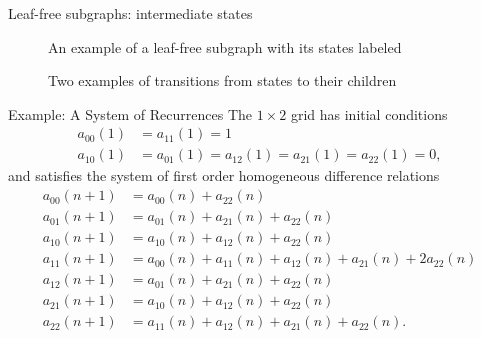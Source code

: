 \documentclass{beamer}%
\newcommand\indxx[2]{#1#2}
\begin{document}
\begin{frame}{Leaf-free subgraphs: intermediate states}
  \begin{figure}[ht!]
    
    \caption{An example of a leaf-free subgraph with its states labeled}
  \end{figure}
  \begin{figure}[ht!]
    
    \caption{Two examples of transitions from states to their children}
  \end{figure}
\end{frame}
%
\begin{frame}{Example: A System of Recurrences}
  The $1 \times 2$ grid has initial conditions
  \begin{align*}
    a_{\indxx 00}(1) &= a_{\indxx 11}(1) = 1 \\
    a_{\indxx 10}(1) &= a_{\indxx 01}(1) = a_{\indxx 12}(1) = a_{\indxx 21}(1) = a_{\indxx 22}(1) = 0,
  \end{align*}
  and satisfies the system of first order homogeneous difference relations
  \begin{align*}
    a_{\indxx 00}(n + 1) &= a_{\indxx 00}(n) + a_{\indxx 22}(n) \\
    a_{\indxx 01}(n + 1) &= a_{\indxx 01}(n) + a_{\indxx 21}(n) + a_{\indxx 22}(n) \\
    a_{\indxx 10}(n + 1) &= a_{\indxx 10}(n) + a_{\indxx 12}(n) + a_{\indxx 22}(n) \\
    a_{\indxx 11}(n + 1) &= a_{\indxx 00}(n) + a_{\indxx 11}(n) + a_{\indxx 12}(n)
                      + a_{\indxx 21}(n) + 2a_{\indxx 22}(n) \\
    a_{\indxx 12}(n + 1) &= a_{\indxx 01}(n) + a_{\indxx 21}(n) + a_{\indxx 22}(n) \\
    a_{\indxx 21}(n + 1) &= a_{\indxx 10}(n) + a_{\indxx 12}(n) + a_{\indxx 22}(n) \\
    a_{\indxx 22}(n + 1) &= a_{\indxx 11}(n) + a_{\indxx 12}(n) + a_{\indxx 21}(n) + a_{\indxx 22}(n).
  \end{align*}
\end{frame}
\end{document}
